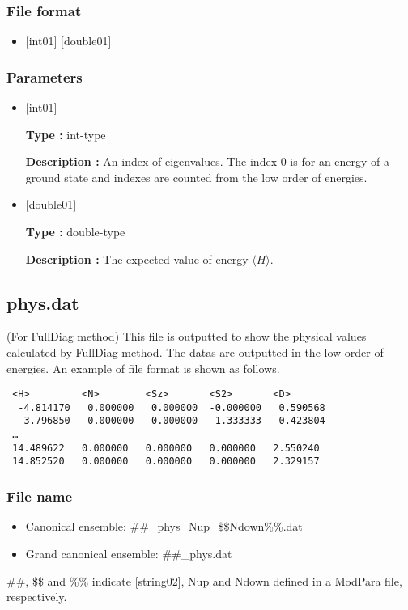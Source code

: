\subsubsection{File format}
 \begin{itemize}
   \item $[$int01$]$ $[$double01$]$ 
  \end{itemize}
\subsubsection{Parameters}
 \begin{itemize}

  \item  $[$int01$]$
  
 {\bf Type :} int-type

{\bf Description :} An index of eigenvalues. The index 0 is for an energy of a ground state and indexes are counted from the low order of energies.

  \item  $[$double01$]$
  
 {\bf Type :} double-type

{\bf Description :} The expected value of energy $\langle H \rangle$.
 
 \end{itemize}



\newpage
\subsection{phys.dat}
\label{Subsec:phys}
(For FullDiag method)  This file is outputted to show the physical values calculated by FullDiag method.  The datas are outputted in the low order of energies. An example of file format is shown as follows.\\
\begin{minipage}{12.5cm}
\begin{screen}
\begin{verbatim}
 <H>         <N>        <Sz>       <S2>       <D> 
  -4.814170   0.000000   0.000000  -0.000000   0.590568
  -3.796850   0.000000   0.000000   1.333333   0.423804
 …
 14.489622   0.000000   0.000000   0.000000   2.550240
 14.852520   0.000000   0.000000   0.000000   2.329157
\end{verbatim}
\end{screen}
\end{minipage}

\subsubsection{File name}
\begin{itemize}
   \item {Canonical ensemble:} \#\#\_phys\_Nup\_\$\$Ndown\%\%.dat
   \item {Grand canonical ensemble:} \#\#\_phys.dat
 \end{itemize}
  \#\#, \$\$ and \%\% indicate [string02], Nup and Ndown defined in a ModPara file, respectively.


